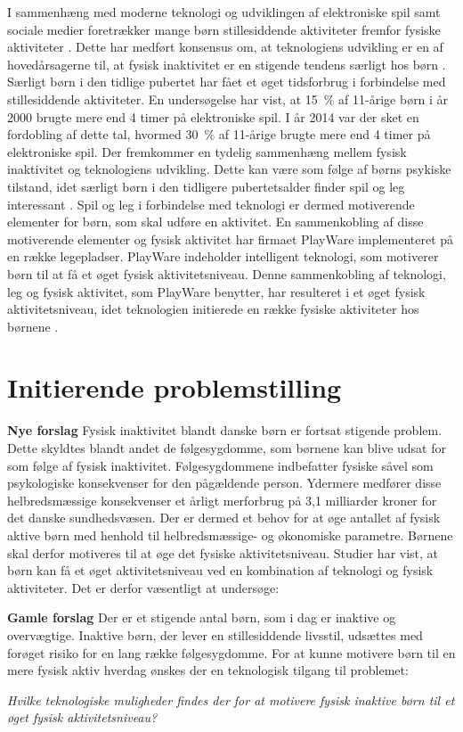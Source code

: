I sammenhæng med moderne teknologi og udviklingen af elektroniske spil samt sociale medier foretrækker mange børn stillesiddende aktiviteter fremfor fysiske aktiviteter \citep{Universitet2014}. Dette har medført konsensus om, at teknologiens udvikling er en af hovedårsagerne til, at fysisk inaktivitet er en stigende tendens særligt hos børn \citep{Kiens2007}. \newline
Særligt børn i den tidlige pubertet har fået et øget tidsforbrug i forbindelse med stillesiddende aktiviteter. En undersøgelse har vist, at 15~\% af 11-årige børn i år 2000 brugte mere end 4 timer på elektroniske spil. I år 2014 var der sket en fordobling af dette tal, hvormed 30~\% af 11-årige brugte mere end 4 timer på elektroniske spil. \citep{Universitet2014} \newline
Der fremkommer en tydelig sammenhæng mellem fysisk inaktivitet og teknologiens udvikling. Dette kan være som følge af børns psykiske tilstand, idet særligt børn i den tidligere pubertetsalder finder spil og leg interessant \citep{Wied2011}. Spil og leg i forbindelse med teknologi er dermed motiverende elementer for børn, som skal udføre en aktivitet. En sammenkobling af disse motiverende elementer og fysisk aktivitet har firmaet PlayWare implementeret på en række legepladser. PlayWare indeholder intelligent teknologi, som motiverer børn til at få et øget fysisk aktivitetsniveau. Denne sammenkobling af teknologi, leg og fysisk aktivitet, som PlayWare benytter, har resulteret i et øget fysisk aktivitetsniveau, idet teknologien initierede en række fysiske aktiviteter hos børnene \citep{Rishoej2010}. 

\section{Initierende problemstilling}
\textbf{Nye forslag}
Fysisk inaktivitet blandt danske børn er fortsat stigende problem. Dette skyldtes blandt andet de følgesygdomme, som børnene kan blive udsat for som følge af fysisk inaktivitet. Følgesygdommene indbefatter fysiske såvel som psykologiske konsekvenser for den pågældende person. Ydermere medfører disse helbredsmæssige konsekvenser et årligt merforbrug på 3,1 milliarder kroner for det danske sundhedsvæsen. \newline
Der er dermed et behov for at øge antallet af fysisk aktive børn med henhold til helbredsmæssige- og økonomiske parametre. Børnene skal derfor motiveres til at øge det fysiske aktivitetsniveau. Studier har vist, at børn kan få et øget aktivitetsniveau ved en kombination af teknologi og fysisk aktiviteter. Det er derfor væsentligt at undersøge: 

\textbf{Gamle forslag}
Der er et stigende antal børn, som i dag er inaktive og overvægtige. Inaktive børn, der lever en stillesiddende livsstil, udsættes med forøget risiko for en lang række følgesygdomme. For at kunne motivere børn til en mere fysisk aktiv hverdag ønskes der en teknologisk tilgang til problemet:

\begin{center}
\textit{Hvilke teknologiske muligheder findes der for at motivere fysisk inaktive børn til et øget fysisk aktivitetsniveau?}
\end{center}